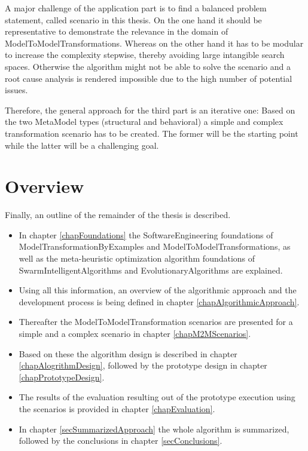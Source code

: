 A major challenge of the application part is to find a balanced problem statement, called scenario in this thesis. On the one hand it should be representative to demonstrate the relevance in the domain of \glspl{ModelToModelTransformation}. Whereas on the other hand it has to be modular to increase the complexity stepwise, thereby avoiding large intangible search spaces. Otherwise the algorithm might not be able to solve the scenario and a root cause analysis is rendered impossible due to the high number of potential issues. 


Therefore, the general approach for the third part is an iterative one: Based on the two \gls{MetaModel} types (structural and behavioral) a simple and complex transformation scenario has to be created. The former will be the starting point while the latter will be a challenging goal. %

\section{Overview}
\label{secOverview}

Finally, an outline of the remainder of the thesis is described.

\begin{itemize}
	\item In chapter \ref{chapFoundations} the \gls{SoftwareEngineering} foundations of \glspl{ModelTransformationByExample} and \glspl{ModelToModelTransformation}, as well as the meta-heuristic optimization algorithm foundations of \glspl{SwarmIntelligentAlgorithm} and \glspl{EvolutionaryAlgorithm} are explained.
	\item Using all this information, an overview of the algorithmic approach and the development process is being defined in chapter \ref{chapAlgorithmicApproach}.
	\item Thereafter the \gls{ModelToModelTransformation} scenarios are presented for a simple and a complex scenario in chapter \ref{chapM2MScenarios}.
	\item Based on these the algorithm design is described in chapter \ref{chapAlogrithmDesign}, followed by the prototype design in chapter \ref{chapPrototypeDesign}.
	\item The results of the evaluation resulting out of the prototype execution using the scenarios is provided in chapter \ref{chapEvaluation}.
	\item In chapter \ref{secSummarizedApproach} the whole algorithm is summarized, followed by the conclusions in chapter \ref{secConclusions}.
\end{itemize}
